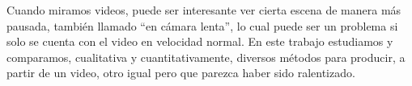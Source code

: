 Cuando miramos videos, puede ser interesante ver cierta escena de manera más pausada, también llamado ``en cámara lenta'', lo cual puede ser un problema si solo se cuenta con el video en velocidad normal. En este trabajo estudiamos y comparamos, cualitativa y cuantitativamente, diversos métodos para producir, a partir de un video, otro igual pero que parezca haber sido ralentizado.
